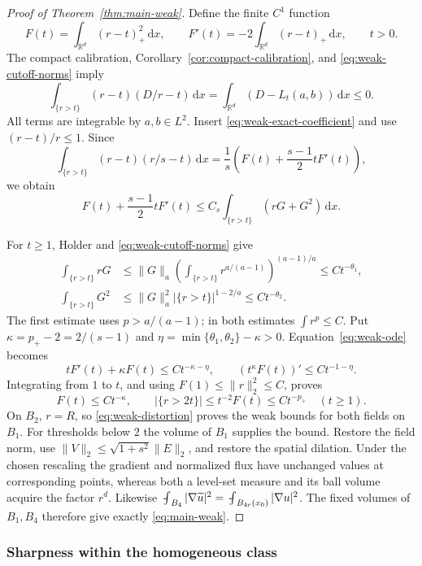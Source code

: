 \documentclass[11pt,a4paper]{article}
\numberwithin{equation}{section}
\theoremstyle{definition}
\theoremstyle{remark}\newtheorem{remark}[theorem]{Remark}
\newcommand{\R}{\mathbb R}
\newcommand{\dd}{\,\mathrm dx}
\newcommand{\norm}[1]{\lVert #1\rVert}
\newcommand{\fint}{\mathop{\rlap{\kern.18em-}\int}\nolimits}
\begin{document}
\begin{proof}[Proof of Theorem~\ref{thm:main-weak}]
Define the finite \(C^1\) function
\[
 F(t)=\int_{\R^d}(r-t)_+^2\dd,\qquad
 F'(t)=-2\int_{\R^d}(r-t)_+\dd,\qquad t>0.
\]
The compact calibration, Corollary~\ref{cor:compact-calibration},
and \eqref{eq:weak-cutoff-norms} imply
\[
 \int_{\{r>t\}}(r-t)(D/r-t)\dd
 =\int_{\R^d}(D-L_t(a,b))\dd\leq0.
\]
All terms are integrable by \(a,b\in L^2\).
Insert \eqref{eq:weak-exact-coefficient} and use
\((r-t)/r\leq1\). Since
\[
 \int_{\{r>t\}}(r-t)(r/s-t)\dd
 =\frac1s\left(F(t)+\frac{s-1}{2}tF'(t)\right),
\]
we obtain
\begin{equation}\label{eq:weak-ode}
 F(t)+\frac{s-1}{2}tF'(t)
 \leq C_s\int_{\{r>t\}}(rG+G^2)\dd .
\end{equation}

For \(t\geq1\), Holder and \eqref{eq:weak-cutoff-norms} give
\begin{align*}
 \int_{\{r>t\}}rG
 &\leq\norm G_a
       \left(\int_{\{r>t\}}r^{a/(a-1)}\right)^{(a-1)/a}
 \leq C t^{-\theta_1},\\
 \int_{\{r>t\}}G^2
 &\leq\norm G_a^2|\{r>t\}|^{1-2/a}
 \leq C t^{-\theta_2}.
\end{align*}
The first estimate uses \(p>a/(a-1)\); in both estimates
\(\int r^p\leq C\). Put
\(\kappa=p_+-2=2/(s-1)\) and
\(\eta=\min\{\theta_1,\theta_2\}-\kappa>0\).
Equation~\eqref{eq:weak-ode} becomes
\[
 tF'(t)+\kappa F(t)\leq C t^{-\kappa-\eta},
 \qquad (t^\kappa F(t))'\leq C t^{-1-\eta}.
\]
Integrating from \(1\) to \(t\), and using
\(F(1)\leq\norm r_2^2\leq C\), proves
\[
 F(t)\leq Ct^{-\kappa},\qquad
 |\{r>2t\}|\leq t^{-2}F(t)\leq Ct^{-p_+}\quad(t\geq1).
\]
On \(B_2\), \(r=R\), so \eqref{eq:weak-distortion} proves the
weak bounds for both fields on \(B_1\). For thresholds below \(2\)
the volume of \(B_1\) supplies the bound. Restore the field norm,
use \(\norm V_2\leq\sqrt{1+s^2}\norm E_2\), and restore the
spatial dilation. Under the chosen rescaling the gradient and
normalized flux have unchanged values at corresponding points,
whereas both a level-set measure and its ball volume acquire
the factor \(r^d\). Likewise
\(\fint_{B_4}|\nabla\widetilde u|^2
=\fint_{B_{4r}(x_0)}|\nabla u|^2\).
The fixed volumes of \(B_1,B_4\) therefore give exactly
\eqref{eq:main-weak}.
\end{proof}

\subsubsection*{Sharpness within the homogeneous class}
\end{document}
